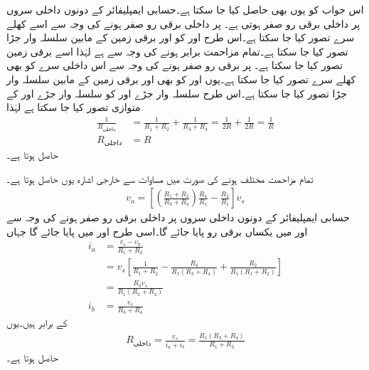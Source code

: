 اس جواب کو یوں بھی حاصل کیا جا سکتا ہے۔حسابی ایمپلیفائر کے دونوں داخلی سروں  پر داخلی برقی رو صفر ہوتی ہے۔ پر داخلی برقی رو صفر  ہونے کی وجہ سے اسے کھلے سرے تصور کیا جا سکتا ہے۔اس طرح   اور  کو  اور برقی زمین کے مابین سلسلہ وار جڑا تصور کیا جا سکتا ہے۔تمام مزاحمت برابر ہونے کی وجہ سے  ہے لہٰذا اسے برقی زمین تصور کیا جا سکتا ہے۔ پر برقی رو صفر ہونے کی وجہ سے اس داخلی سرے  کو بھی کھلے سرے تصور کیا جا سکتا ہے۔یوں  اور  کو بھی  اور برقی زمین کے مابین سلسلہ وار جڑا تصور کیا جا سکتا ہے۔اس طرح سلسلہ وار جڑے  اور  کو سلسلہ وار جڑے  اور  کے متوازی تصور کیا جا سکتا ہے لہٰذا
\begin{align*}
\frac{1}{R_{\text{داخلی}}}&=\frac{1}{R_1+R_2}+\frac{1}{R_3+R_4}=\frac{1}{2R}+\frac{1}{2R}=\frac{1}{R}\\
R_{\text{داخلی}}&=R
\end{align*}
حاصل ہوتا ہے۔

تمام مزاحمت مختلف ہونے کی صورت میں مساوات  سے خارجی اشارہ  یوں حاصل ہوتا ہے۔
\begin{align*}
v_o=\left[\left(\frac{R_1+R_2}{R_3+R_4} \right)\frac{R_4}{R_1}-\frac{R_2}{R_1} \right]v_s
\end{align*}
حسابی ایمپلیفائر کے دونوں داخلی سروں  پر داخلی برقی رو صفر ہونے کی وجہ سے  اور  میں یکساں برقی رو  پایا جائے گا۔اسی طرح  اور  میں  پایا جائے گا جہاں
\begin{align*}
i_a&=\frac{v_s-v_0}{R_1+R_2}\\
&=v_s\left[\frac{1}{R_1+R_2}-\frac{R_4}{R_1 \left(R_3+R_4 \right)}+\frac{R_2}{R_1 \left(R_1+R_2 \right)} \right]\\
&=\frac{R_3 v_s}{R_1\left(R_3+R_4 \right)}\\
i_b&=\frac{v_s}{R_3+R_4}
\end{align*}
کے برابر ہیں۔یوں
\begin{align*}
R_{\text{داخلی}}=\frac{v_s}{i_a+i_b}=\frac{R_1 \left(R_3+R_4 \right)}{R_1+R_3}
\end{align*}
حاصل ہوتا ہے۔

